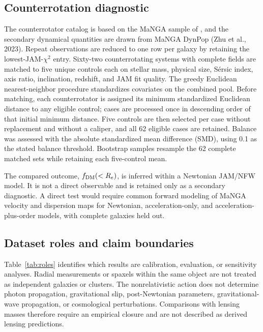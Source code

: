 \documentclass[utf8]{FrontiersinHarvard}
\begin{document}
\subsection{Counterrotation diagnostic}\label{counterrotation-diagnostic}

The counterrotator catalog is based on the MaNGA sample of \citet{bevacqua2022}, and the secondary dynamical quantities are drawn from MaNGA DynPop (Zhu et al., 2023). Repeat observations are reduced to one row per galaxy by retaining the lowest-JAM-\(\chi^2\) entry. Sixty-two counterrotating systems with complete fields are matched to five unique controls each on stellar mass, physical size, Sérsic index, axis ratio, inclination, redshift, and JAM fit quality. The greedy Euclidean nearest-neighbor procedure standardizes covariates on the combined pool. Before matching, each counterrotator is assigned its minimum standardized Euclidean distance to any eligible control; cases are processed once in descending order of that initial minimum distance. Five controls are then selected per case without replacement and without a caliper, and all 62 eligible cases are retained. Balance was assessed with the absolute standardized mean difference (SMD), using 0.1 as the stated balance threshold. Bootstrap samples resample the 62 complete matched sets while retaining each five-control mean.

The compared outcome, \(f_{\rm DM}(<R_e)\), is inferred within a Newtonian JAM/NFW model. It is not a direct observable and is retained only as a secondary diagnostic. A direct test would require common forward modeling of MaNGA velocity and dispersion maps for Newtonian, acceleration-only, and acceleration-plus-order models, with complete galaxies held out.

\subsection{Dataset roles and claim boundaries}\label{dataset-roles-and-claim-boundaries}

Table~\ref{tab:roles} identifies which results are calibration, evaluation, or sensitivity analyses. Radial measurements or spaxels within the same object are not treated as independent galaxies or clusters. The nonrelativistic action does not determine photon propagation, gravitational slip, post-Newtonian parameters, gravitational-wave propagation, or cosmological perturbations. Comparisons with lensing masses therefore require an empirical closure and are not described as derived lensing predictions.
\end{document}
